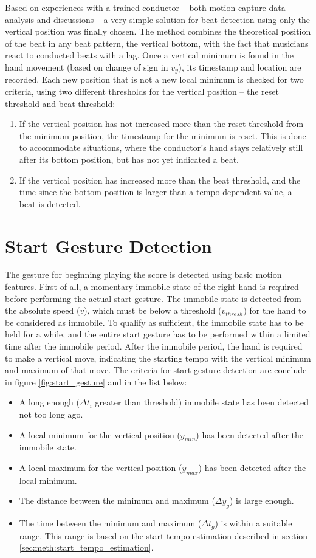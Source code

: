 Based on experiences with a trained conductor --
both motion capture data analysis and discussions --
a very simple solution for beat detection
using only the vertical position was finally chosen.
The method combines the theoretical position of the beat
in any beat pattern, the vertical bottom,
with the fact that musicians react to conducted beats with a lag.
Once a vertical minimum is found in the hand movement
(based on change of sign in $v_y$),
its timestamp and location are recorded.
Each new position that is not a new local minimum
is checked for two criteria,
using two different thresholds for the vertical position --
the reset threshold and beat threshold:
\begin{enumerate}
\item If the vertical position has not increased more than
the reset threshold from the minimum position,
the timestamp for the minimum is reset.
This is done to accommodate situations,
where the conductor's hand stays relatively still after
its bottom position, but has not yet indicated a beat.
\item If the vertical position has increased more
than the beat threshold,
and the time since the bottom position
is larger than a tempo dependent value,
a beat is detected.
\end{enumerate}

\section{Start Gesture Detection}

The gesture for beginning playing the score
is detected using basic motion features.
First of all,
a momentary immobile state of the right hand is required
before performing the actual start gesture.
The immobile state is detected from the absolute speed ($v$),
which must be below a threshold ($v_{thresh}$)
for the hand to be considered as immobile.
To qualify as sufficient,
the immobile state has to be held for a while,
and the entire start gesture has to be performed
within a limited time after the immobile period.
After the immobile period,
the hand is required to make a vertical move,
indicating the starting tempo with the 
vertical minimum and maximum of that move.
The criteria for start gesture detection
are conclude in figure \ref{fig:start_gesture}
and in the list below:
\begin{itemize}
\item A long enough ($\Delta t_i$ greater than threshold)
immobile state has been detected not too long ago.
\item A local minimum for the vertical position ($y_{min}$) has been detected after the immobile state.
\item A local maximum for the vertical position ($y_{max}$) has been detected after the local minimum.
\item The distance between the minimum and maximum ($\Delta y_g$) is large enough.
\item The time between the minimum and maximum ($\Delta t_g$)
is within a suitable range.
This range is based on the start tempo estimation described in section
\ref{sec:meth:start_tempo_estimation}.
\end{itemize}


